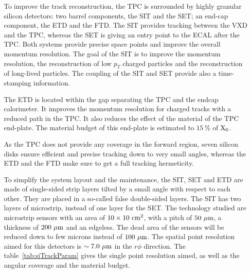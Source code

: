       To improve the track reconstruction, the \gls{TPC} is surrounded by highly granular silicon detectors: two barrel components, the \gls{SIT} and the \gls{SET}; an end-cap component, the \gls{ETD} and the \gls{FTD}.
      The \gls{SIT} provides tracking between the \gls{VXD} and the \gls{TPC}, whereas the \gls{SET} is giving an entry point to the \gls{ECAL} after the \gls{TPC}.
      Both systems provide precise space points and improve the overall momentum resolution.
      The goal of the \gls{SIT} is to improve the momentum resolution, the reconstruction of low $p_{T}$ charged particles and the reconstruction of long-lived particles.
      The coupling of the \gls{SIT} and \gls{SET} provide also a time-stamping information.

      The \gls{ETD} is located within the gap separating the \gls{TPC} and the endcap calorimeter. 
      It improves the momentum resolution for charged tracks with a reduced path in the \gls{TPC}.
      It also reduces the effect of the material of the \gls{TPC} end-plate. 
      The material budget of this end-plate is estimated to $15~\%$ of $\rm{X_0}$.

      As the \gls{TPC} does not provide any coverage in the forward region, seven silicon disks ensure efficient and precise tracking down to very small angles, whereas the \gls{ETD} and the \gls{FTD} make sure to get a full tracking hermeticity.

      To simplify the system layout and the maintenance, the \gls{SIT}, \gls{SET} and \gls{ETD} are made of single-sided strip layers tilted by a small angle with respect to each other. 
      They are placed in a so-called false double-sided layers.
      The \gls{SIT} has two layers of microstrip, instead of one layer for the \gls{SET}. 
      The technology studied are microstrip sensors with an area of $10 \times 10~\rm{cm}^2$, with a pitch of $50~\rm{\mu m}$, a thickness of $200~\rm{\mu m}$ and an edgeless.
      The dead area of the sensors will be reduced down to few microns instead of $100~\rm{\mu m}$.
      The spatial point resolution aimed for this detectors is $\sim 7.0~\rm{\mu m}$ in the $r\phi$ direction.
      The table~\ref{tab:siTrackParam} gives the single point resolution aimed, as well as the angular coverage and the material budget.

